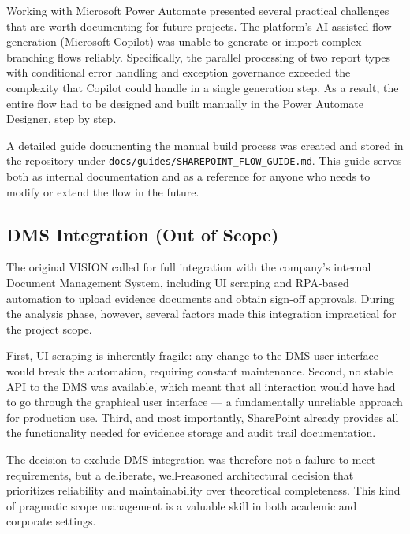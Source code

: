 \documentclass[11pt,a4paper]{article}
\begin{document}
Working with Microsoft Power Automate presented several practical challenges that are worth documenting for future projects. The platform's AI-assisted flow generation (Microsoft Copilot) was unable to generate or import complex branching flows reliably. Specifically, the parallel processing of two report types with conditional error handling and exception governance exceeded the complexity that Copilot could handle in a single generation step. As a result, the entire flow had to be designed and built manually in the Power Automate Designer, step by step.

A detailed guide documenting the manual build process was created and stored in the repository under \texttt{docs/guides/SHAREPOINT\_FLOW\_GUIDE.md}. This guide serves both as internal documentation and as a reference for anyone who needs to modify or extend the flow in the future.

\subsection{DMS Integration (Out of Scope)}

The original VISION called for full integration with the company's internal Document Management System, including UI scraping and RPA-based automation to upload evidence documents and obtain sign-off approvals. During the analysis phase, however, several factors made this integration impractical for the project scope.

First, UI scraping is inherently fragile: any change to the DMS user interface would break the automation, requiring constant maintenance. Second, no stable API to the DMS was available, which meant that all interaction would have had to go through the graphical user interface --- a fundamentally unreliable approach for production use. Third, and most importantly, SharePoint already provides all the functionality needed for evidence storage and audit trail documentation.

The decision to exclude DMS integration was therefore not a failure to meet requirements, but a deliberate, well-reasoned architectural decision that prioritizes reliability and maintainability over theoretical completeness. This kind of pragmatic scope management is a valuable skill in both academic and corporate settings.


\end{document}
